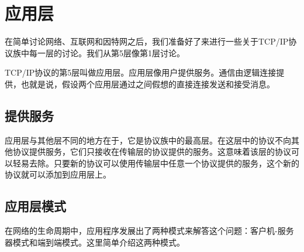 \section{应用层}
在简单讨论网络、互联网和因特网之后，我们准备好了来进行一些关于TCP/IP协议族中每一层的讨论。我们从第5层像第1层讨论。

TCP/IP协议的第5层叫做应用层。应用层像用户提供服务。通信由逻辑连接提供，也就是说，假设两个应用层通过之间假想的直接连接发送和接受消息。

\subsection{提供服务}
应用层与其他层不同的地方在于，它是协议族中的最高层。在这层中的协议不向其他协议提供服务，它们只接收在传输层的协议提供的服务。这意味着该层的协议可以轻易去除。只要新的协议可以使用传输层中任意一个协议提供的服务，这个新的协议就可以添加到应用层上。

\subsection{应用层模式}

在网络的生命周期中，应用程序发展出了两种模式来解答这个问题：客户机-服务器模式和端到端模式。这里简单介绍这两种模式。
